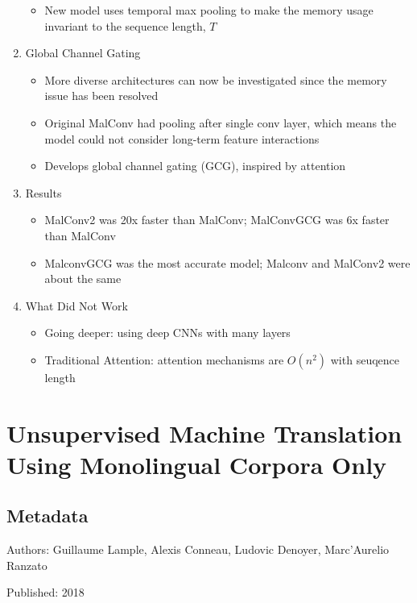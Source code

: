 \documentclass{article}
\begin{document}
\begin{enumerate}
\begin{itemize}
		\item New model uses temporal max pooling to make the memory usage invariant to the sequence length, $T$
	\end{itemize}
	\item Global Channel Gating
	\begin{itemize}
		\item More diverse architectures can now be investigated since the memory issue has been resolved
		\item Original MalConv had pooling after single conv layer, which means the model could not consider long-term feature interactions
		\item Develops global channel gating (GCG), inspired by attention
	\end{itemize}
	\item Results
	\begin{itemize}
		\item MalConv2 was 20x faster than MalConv; MalConvGCG was 6x faster than MalConv
		\item MalconvGCG was the most accurate model; Malconv and MalConv2 were about the same
	\end{itemize}
	\item What Did Not Work
	\begin{itemize}
		\item Going deeper: using deep CNNs with many layers
		\item Traditional Attention: attention mechanisms are $O(n^2)$ with seuqence length
	\end{itemize}
\end{enumerate}

\pagebreak


\section*{Unsupervised Machine Translation Using Monolingual Corpora Only}

\subsection*{Metadata}

\noindent Authors: Guillaume Lample, Alexis Conneau, Ludovic Denoyer, Marc'Aurelio Ranzato

\noindent Published: 2018
\end{document}
